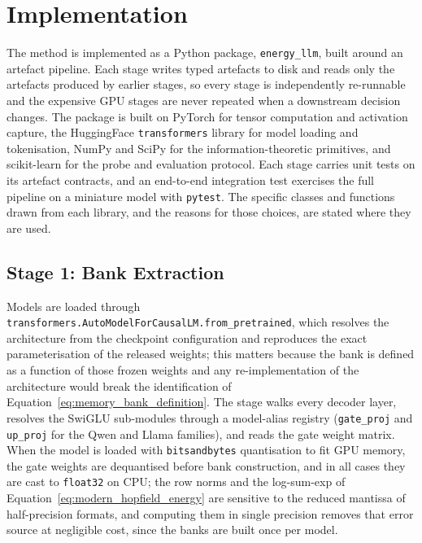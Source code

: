 \section{Implementation}
\label{sec:implementation}

The method is implemented as a Python package, \texttt{energy\_llm}, built
around an artefact pipeline. Each stage writes typed artefacts to disk and
reads only the artefacts produced by earlier stages, so every stage is
independently re-runnable and the expensive GPU stages are never repeated
when a downstream decision changes. The package is built on PyTorch
\citep{paszke2019pytorch} for tensor computation and activation capture,
the HuggingFace \texttt{transformers} library \citep{wolf2020transformers}
for model loading and tokenisation, NumPy and SciPy for the
information-theoretic primitives, and scikit-learn
\citep{pedregosa2011scikit} for the probe and evaluation protocol. Each
stage carries unit tests on its artefact contracts, and an end-to-end
integration test exercises the full pipeline on a miniature model with
\texttt{pytest}. The
specific classes and functions drawn from each library, and the reasons for
those choices, are stated where they are used.

\subsection{Stage 1: Bank Extraction}
\label{subsec:stage1}

Models are loaded through
\texttt{transformers.AutoModelForCausalLM.from\_pretrained}, which resolves
the architecture from the checkpoint configuration and reproduces the exact
parameterisation of the released weights; this matters because the bank is
defined as a function of those frozen weights and any re-implementation of
the architecture would break the identification of
Equation~\eqref{eq:memory_bank_definition}. The stage walks every decoder
layer, resolves the SwiGLU sub-modules through a model-alias registry
(\texttt{gate\_proj} and \texttt{up\_proj} for the Qwen and Llama
families), and reads the gate weight matrix. When the model is loaded with
\texttt{bitsandbytes} quantisation to fit GPU memory, the gate weights are
dequantised before bank construction, and in all cases they are cast to
\texttt{float32} on CPU; the row norms and the log-sum-exp of
Equation~\eqref{eq:modern_hopfield_energy} are sensitive to the reduced
mantissa of half-precision formats, and computing them in single precision
removes that error source at negligible cost, since the banks are built
once per model.

